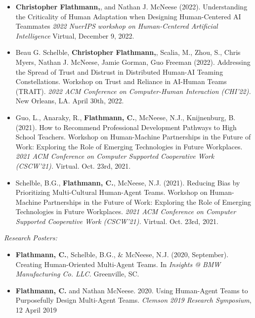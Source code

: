 \begin{itemize}[align=left, labelwidth=3em,]
\setlength\itemsep{1em}

\item[WP.4] \textbf{Christopher Flathmann,}, and Nathan J. McNeese (2022). Understanding the Criticality of Human Adaptation when Designing Human-Centered AI Teammates \textit{2022 NuerIPS workshop on Human-Centered Artificial Intelligence} Virtual, December 9, 2022. \\

\item[WP.3] Beau G. Schelble, \textbf{Christopher Flathmann,}, Scalia, M., Zhou, S., Chris Myers, Nathan J. McNeese, Jamie Gorman, Guo Freeman (2022). Addressing the Spread of Trust and Distrust in Distributed Human-AI Teaming Constellations. Workshop on Trust and Reliance in AI-Human Teams (TRAIT). \textit{2022 ACM Conference on Computer-Human Interaction (CHI'22).} New Orleans, LA. April 30th, 2022. \\

\item[WP.2] Guo, L., Anaraky, R., \textbf{Flathmann, C.}, McNeese, N.J., Knijnenburg, B. (2021). How to Recommend Professional Development Pathways to High School Teachers. Workshop on Human-Machine Partnerships in the Future of Work: Exploring the Role of Emerging Technologies in Future Workplaces. \textit{2021 ACM Conference on Computer Supported Cooperative Work (CSCW'21).} Virtual. Oct. 23rd, 2021. \\

\item[WP.1] Schelble, B.G., \textbf{Flathmann, C.}, McNeese, N.J. (2021). Reducing Bias by Prioritizing Multi-Cultural Human-Agent Teams. Workshop on Human-Machine Partnerships in the Future of Work: Exploring the Role of Emerging Technologies in Future Workplaces. \textit{2021 ACM Conference on Computer Supported Cooperative Work (CSCW'21).} Virtual. Oct. 23rd, 2021.

\end{itemize}

\bigskip \noindent
\textit{Research Posters:}
\bigskip \noindent

\begin{itemize}[align=left, labelwidth=3em,]
\setlength\itemsep{1em}

\item[P.2] \textbf{Flathmann, C.}, Schelble, B.G., \& McNeese, N.J. (2020, September). Creating Human-Oriented Multi-Agent Teams. In \textit{Insights @ BMW Manufacturing Co. LLC.} Greenville, SC. \\

\item[P.1] \textbf{Flathmann, C.} and Nathan McNeese. 2020. Using Human-Agent Teams to Purposefully Design Multi-Agent Teams. \textit{Clemson 2019 Research Symposium}, 12 April 2019 \\

\end{itemize}

